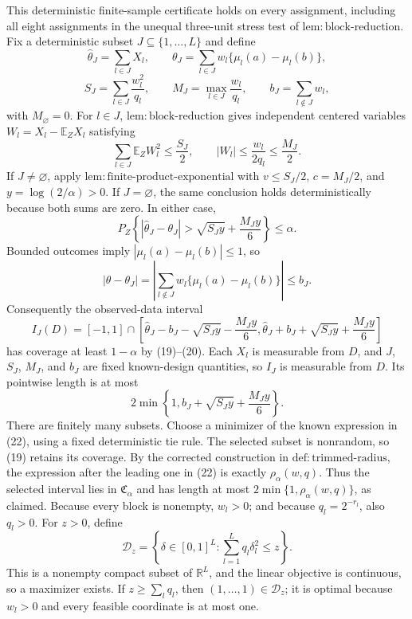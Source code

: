 This deterministic finite-sample certificate holds on every assignment, including all eight assignments in the unequal three-unit stress test of \(\mathrm{lem{:}block\text{-}reduction}\).
Fix a deterministic subset \(J\subseteq\{1,\ldots,L\}\) and define
\[
 \widehat\theta_J=\sum_{l\in J}X_l,
 \qquad
 \theta_J=\sum_{l\in J}w_l\{\mu_l(a)-\mu_l(b)\},
\]
\[
 S_J=\sum_{l\in J}\frac{w_l^2}{q_l},\qquad
 M_J=\max_{l\in J}\frac{w_l}{q_l},\qquad
 b_J=\sum_{l\notin J}w_l,
\tag{17}
\]
with \(M_\varnothing=0\). For \(l\in J\), \(\mathrm{lem{:}block\text{-}reduction}\) gives independent centered variables \(W_l=X_l-\mathbb E_ZX_l\) satisfying
\[
 \sum_{l\in J}\mathbb E_ZW_l^2\le\frac{S_J}{2},
 \qquad
 |W_l|\le\frac{w_l}{2q_l}\le\frac{M_J}{2}.
\tag{18}
\]
If \(J\ne\varnothing\), apply \(\mathrm{lem{:}finite\text{-}product\text{-}exponential}\) with \(v\le S_J/2\), \(c=M_J/2\), and \(y=\log(2/\alpha)>0\). If \(J=\varnothing\), the same conclusion holds deterministically because both sums are zero. In either case,
\[
 P_Z\!\left\{|\widehat\theta_J-\theta_J|>
 \sqrt{S_Jy}+\frac{M_Jy}{6}\right\}\le\alpha.
\tag{19}
\]
Bounded outcomes imply \(|\mu_l(a)-\mu_l(b)|\le1\), so
\[
 |\theta-\theta_J|
 =\left|\sum_{l\notin J}w_l\{\mu_l(a)-\mu_l(b)\}\right|
 \le b_J.
\tag{20}
\]
Consequently the observed-data interval
\[
 I_J(D)=[-1,1]\cap
 \left[\widehat\theta_J-b_J-\sqrt{S_Jy}-\frac{M_Jy}{6},
       \widehat\theta_J+b_J+\sqrt{S_Jy}+\frac{M_Jy}{6}\right]
\tag{21}
\]
has coverage at least \(1-\alpha\) by (19)--(20). Each \(X_l\) is measurable from \(D\), and \(J\), \(S_J\), \(M_J\), and \(b_J\) are fixed known-design quantities, so \(I_J\) is measurable from \(D\). Its pointwise length is at most
\[
 2\min\!\left\{1,b_J+\sqrt{S_Jy}+\frac{M_Jy}{6}\right\}.
\tag{22}
\]
There are finitely many subsets. Choose a minimizer of the known expression in (22), using a fixed deterministic tie rule. The selected subset is nonrandom, so (19) retains its coverage. By the corrected construction in \(\mathrm{def{:}trimmed\text{-}radius}\), the expression after the leading one in (22) is exactly \(\rho_\alpha(w,q)\). Thus the selected interval lies in \(\mathfrak C_\alpha\) and has length at most \(2\min\{1,\rho_\alpha(w,q)\}\), as claimed.
Because every block is nonempty, \(w_l>0\); and because \(q_l=2^{-r_l}\), also \(q_l>0\). For \(z>0\), define
\[
 \mathcal D_z=\left\{\delta\in[0,1]^L:
                 \sum_{l=1}^Lq_l\delta_l^2\le z\right\}.
\tag{23}
\]
This is a nonempty compact subset of \(\mathbb R^L\), and the linear objective is continuous, so a maximizer exists. If \(z\ge\sum_lq_l\), then \((1,\ldots,1)\in\mathcal D_z\); it is optimal because \(w_l>0\) and every feasible coordinate is at most one.


